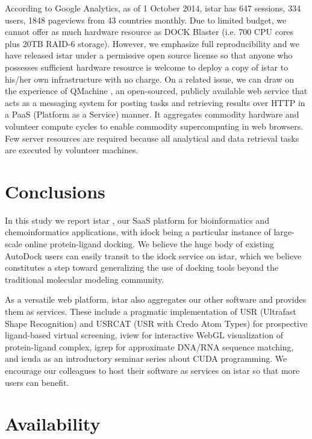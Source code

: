 According to Google Analytics, as of 1 October 2014, istar has 647 sessions, 334 users, 1848 pageviews from 43 countries monthly. Due to limited budget, we cannot offer as much hardware resource as DOCK Blaster (i.e. 700 CPU cores plus 20TB RAID-6 storage). However, we emphasize full reproducibility \citep{965} and we have released istar under a permissive open source license so that anyone who possesses sufficient hardware resource is welcome to deploy a copy of istar to his/her own infrastructure with no charge. On a related issue, we can draw on the experience of QMachine \citep{1405}, an open-sourced, publicly available web service that acts as a messaging system for posting tasks and retrieving results over HTTP in a PaaS (Platform as a Service) manner. It aggregates commodity hardware and volunteer compute cycles to enable commodity supercomputing in web browsers. Few server resources are required because all analytical and data retrieval tasks are executed by volunteer machines.

\section{Conclusions}

In this study we report istar \citep{1362}, our SaaS platform for bioinformatics and chemoinformatics applications, with idock \citep{1153} being a particular instance of large-scale online protein-ligand docking. We believe the huge body of existing AutoDock users can easily transit to the idock service on istar, which we believe constitutes a step toward generalizing the use of docking tools beyond the traditional molecular modeling community.

As a versatile web platform, istar also aggregates our other software and provides them as services. These include a pragmatic implementation of USR (Ultrafast Shape Recognition) \citep{1379} and USRCAT (USR with Credo Atom Types) \citep{1331} for prospective ligand-based virtual screening, iview \citep{1366} for interactive WebGL visualization of protein-ligand complex, igrep \citep{1138} for approximate DNA/RNA sequence matching, and icuda as an introductory seminar series about CUDA programming. We encourage our colleagues to host their software as services on istar so that more users can benefit.

\section{Availability}


